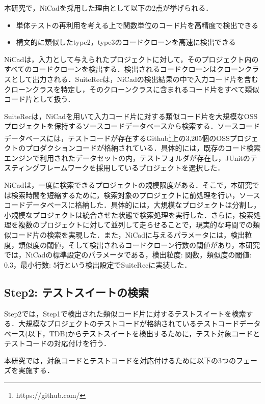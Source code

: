 \documentclass[12pt]{jarticle} %
\begin{document}
本研究で，{\sf NiCad}を採用した理由として以下の2点が挙げられる．

\begin{itemize}
\item 単体テストの再利用を考える上で関数単位のコード片を高精度で検出できる
\item 構文的に類似したtype2，type3のコードクローンを高速に検出できる
\end{itemize}


{\sf NiCad}は，入力として与えられたプロジェクトに対して，そのプロジェクト内のすべてのコードクローンを検出する．検出されるコードクローンはクローンクラスとして出力される．{\sf SuiteRec}は，{\sf NiCad}の検出結果の中で入力コード片を含むクローンクラスを特定し，そのクローンクラスに含まれるコード片をすべて類似コード片として扱う．

{\sf SuiteRec}は，{\sf NiCad}を用いて入力コード片に対する類似コード片を大規模なOSSプロジェクトを保持するソースコードデータベースから検索する．ソースコードデータベースには，テストコードが存在するGithub\footnote{https://github.com/}上の3,205個のOSSプロジェクトのプロダクションコードが格納されている．具体的には，既存のコード検索エンジンで利用されたデータセット\cite{FaCoY}の内，テストフォルダが存在し，JUnitのテスティングフレームワークを採用しているプロジェクトを選択した．

{\sf NiCad}は，一度に検索できるプロジェクトの規模限度がある．そこで，本研究では検索時間を短縮するために，検索対象のプロジェクトに前処理を行い，ソースコードデータベースに格納した．具体的には，大規模なプロジェクトは分割し，小規模なプロジェクトは統合させた状態で検索処理を実行した．さらに，検索処理を複数のプロジェクトに対して並列して走らせることで，現実的な時間での類似コード片の検索を実現した．また，{\sf NiCad}に与えるパラメータには，検出粒度，類似度の閾値，そして検出されるコードクローン行数の閾値があり，本研究では，{\sf NiCad}の標準設定のパラメータである，検出粒度: 関数，類似度の閾値: 0.3，最小行数: 5行という検出設定で{\sf SuiteRec}に実装した．

\subsection{Step2: テストスイートの検索}
Step2では，Step1で検出された類似コード片に対するテストスイートを検索する．大規模なプロジェクトのテストコードが格納されているテストコードデータベース(以下，TDB)からテストスイートを検出するために，テスト対象コードとテストコードの対応付けを行う．

本研究では，対象コードとテストコードを対応付けるために以下の3つのフェーズを実施する．
\end{document}
